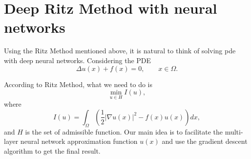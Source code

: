 \documentclass{article}
\begin{document}
\section{Deep Ritz Method with neural networks}
\par Using the Ritz Method mentioned above, it is natural to think of solving pde with deep neural networks. Considering the PDE
\begin{equation}
\Delta u(x)+f(x)=0,\qquad x\in \Omega.
\end {equation}
\par According to Ritz Method, what we need to do is
\begin{equation}
\min\limits_{u\in H}{I(u)},
\end{equation}
where
\begin{equation}\label{I_equ}
I(u)=\int_\Omega\left(\frac{1}{2}|\nabla u(x)|^2-f(x)u(x)\right)dx,
\end{equation}
and $H$ is the set of admissible function. Our main idea is to facilitate the multi-layer neural network approximation function $u(x)$ and use the gradient descent algorithm to get the final result.\\
\end{document}
